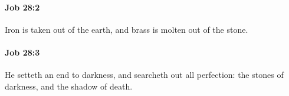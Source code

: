 		\paragraph{Job 28:2} %
			\label{JOB-28-2}

			Iron is taken out of the earth, and brass is molten out of the stone.


		\paragraph{Job 28:3} %
			\label{JOB-28-3}

			He setteth an end to darkness, and searcheth out all perfection: the stones of darkness, and the shadow of death.


